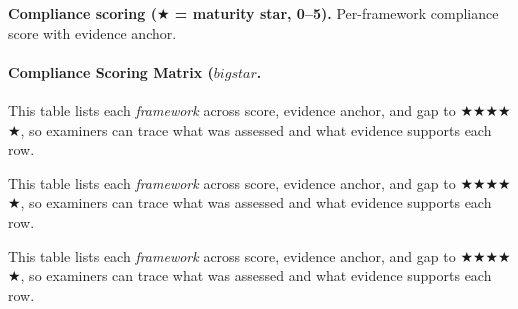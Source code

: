 \noindent\textbf{Compliance scoring ($\bigstar$ = maturity star, 0--5).} Per-framework compliance score with evidence anchor.

\paragraph{Compliance Scoring Matrix ($bigstar$.}



\noindent This table lists each \textit{framework} across score, evidence anchor, and gap to $\bigstar$$\bigstar$$\bigstar$$\bigstar$$\bigstar$, so examiners can trace what was assessed and what evidence supports each row.



\noindent This table lists each \textit{framework} across score, evidence anchor, and gap to $\bigstar$$\bigstar$$\bigstar$$\bigstar$$\bigstar$, so examiners can trace what was assessed and what evidence supports each row.


\noindent This table lists each \textit{framework} across score, evidence anchor, and gap to $\bigstar$$\bigstar$$\bigstar$$\bigstar$$\bigstar$, so examiners can trace what was assessed and what evidence supports each row.



